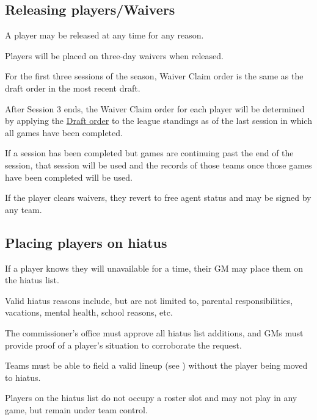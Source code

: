 \subsection{Releasing players/Waivers}
\begin{deepEnumerate}
	\item A player may be released at any time for any reason.
	\item Players will be placed on three-day waivers when released.
	\begin{deepEnumerate}
		\item For the first three sessions of the season, Waiver Claim order is the same as the draft order in the most recent draft.
		\item After Session 3 ends, the Waiver Claim order for each player will be determined by applying the \hyperref[sec:Draft order]{Draft order}
		to the league standings	as of the last session in which all games have been completed.
		\begin{deepEnumerate}
			\item If a session has been completed but games are continuing past the end of the session, 
			that session will be used and the records of those teams once those games have been completed will be used.
		\end{deepEnumerate}
		\item If the player clears waivers, they revert to free agent status and may be signed by any team.
	\end{deepEnumerate}
\end{deepEnumerate}

\subsection{Placing players on hiatus}
\begin{deepEnumerate}
	\item If a player knows they will unavailable for a time, their GM may place them on the hiatus list.
	\begin{deepEnumerate}
		\item Valid hiatus reasons include, but are not limited to,	parental responsibilities, vacations, mental health, school reasons, etc.
		\item The commissioner's office must approve all hiatus list additions,	and GMs must provide proof of a player's situation to corroborate the request.
		\item Teams must be able to field a valid lineup (see ) without the player being moved to hiatus.
	\end{deepEnumerate}
	\item Players on the hiatus list do not occupy a roster slot and may not play in any game, but remain under team control.
\end{deepEnumerate}

